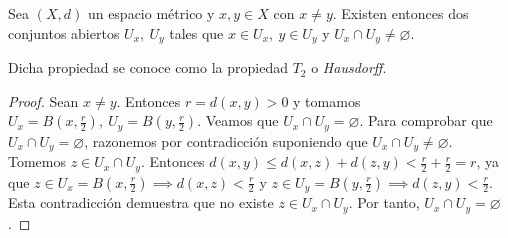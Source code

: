 \begin{properties}
  Sea $(X,d)$ un espacio métrico y $x,y \in X$ con $x \neq y$. Existen entonces dos conjuntos abiertos $U_x,\ U_y$ tales que $x \in U_x,\ y \in U_y$ y $U_x \cap U_y \neq \varnothing $.
\end{properties}
\begin{ndef}[Hausdorff]
  Dicha propiedad se conoce como la propiedad $T_2$ o \textit{Hausdorff}.
\end{ndef}
\begin{proof}
  Sean $x \neq y$. Entonces $r=d(x,y)>0$ y tomamos $U_x = B(x,\frac{r}{2}),\ U_y=B(y,\frac{r}{2})$. Veamos que $U_x \cap U_y=\varnothing $. Para comprobar que $U_x \cap U_y=\varnothing $, razonemos por contradicción suponiendo que $U_x \cap U_y \neq \varnothing $. Tomemos $z \in U_x \cap U_y$. Entonces $d(x,y) \le  d(x,z) + d(z,y) < \frac{r}{2} + \frac{r}{2} = r$, ya que $z \in U_x=B(x,\frac{r}{2}) \implies d(x,z)<\frac{r}{2}$ y $z \in U_y=B(y,\frac{r}{2}) \implies d(z,y)<\frac{r}{2}$. Esta contradicción demuestra que no existe $z \in U_x \cap U_y$. Por tanto, $U_x \cap U_y = \varnothing $.
\end{proof}

